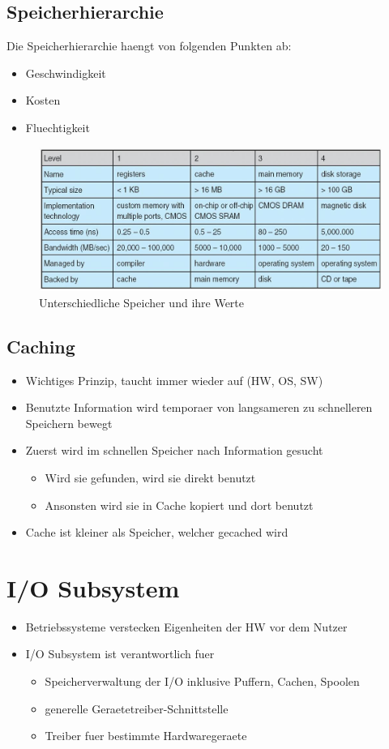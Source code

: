 \documentclass[a4paper]{scrreprt}
\begin{document}
\subsection{Speicherhierarchie}
Die Speicherhierarchie haengt von folgenden Punkten ab:
\begin{itemize}
	\item Geschwindigkeit
	\item Kosten
	\item Fluechtigkeit
\end{itemize}

\begin{figure}[ht]
\centering
\includegraphics[scale=0.4]{storage.png}
\caption{Unterschiedliche Speicher und ihre Werte}
\end{figure}

\subsection{Caching}
\begin{itemize}
	\item Wichtiges Prinzip, taucht immer wieder auf (HW, OS, SW)
	\item Benutzte Information wird temporaer von langsameren zu schnelleren Speichern bewegt
	\item Zuerst wird im schnellen Speicher nach Information gesucht
		\begin{itemize}
			\item Wird sie gefunden, wird sie direkt benutzt
			\item Ansonsten wird sie in Cache kopiert und dort benutzt
		\end{itemize}
	\item Cache ist kleiner als Speicher, welcher gecached wird
\end{itemize}

\section{I/O Subsystem}
\begin{itemize}
	\item Betriebssysteme verstecken Eigenheiten der HW vor dem Nutzer
	\item I/O Subsystem ist verantwortlich fuer
		\begin{itemize}
			\item Speicherverwaltung der I/O inklusive Puffern, Cachen, Spoolen
			\item generelle Geraetetreiber-Schnittstelle
			\item Treiber fuer bestimmte Hardwaregeraete
		\end{itemize}
\end{itemize}
\end{document}
